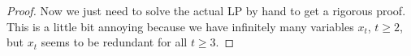 \documentclass[12pt]{article}
\begin{document}
\begin{proof}
  Now we just need to solve the actual LP by hand to get a rigorous proof.  This is a little bit annoying because we have infinitely many variables $x_t$, $t\ge 2$, but $x_t$ seems to be redundant for all $t\ge 3$.
\end{proof}



\end{document}
